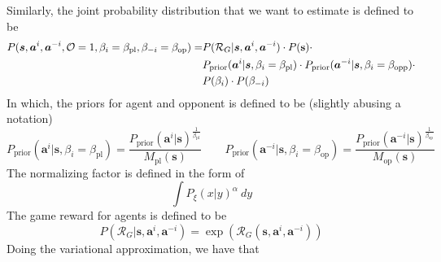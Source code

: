 Similarly, the joint probability distribution that we want to estimate is defined to be 
\begin{equation}
    \begin{aligned}
        P(\boldsymbol{s}, \boldsymbol{a}^i, \boldsymbol{a}^{-i}, \mathcal{O} = 1, \beta_i = \beta_{\text{pl}}, \beta_{-i} = \beta_{\text{op}}) = &P(\mathcal{R}_G | \boldsymbol{s}, \boldsymbol{a}^i, \boldsymbol{a}^{-i})\cdot P(\bold{s}) \cdot \\
        &P_{\text{prior}}(\boldsymbol{a}^i | \boldsymbol{s}, \beta_i = \beta_{\text{pl}}) \cdot P_{\text{prior}}(\boldsymbol{a}^{-i} | \boldsymbol{s}, \beta_i = \beta_{\text{opp}}) \cdot \\
        &P(\beta_i) \cdot P(\beta_{-i})
    \end{aligned}
\end{equation}
In which, the priors for agent and opponent is defined to be (slightly abusing a notation)
\begin{equation}
    P_{\text{prior}}(\boldsymbol{a}^i | \boldsymbol{s}, \beta_i = \beta_{\text{pl}}) = \frac{P_{\text{prior}}(\boldsymbol{a}^i | \boldsymbol{s})^{\frac{1}{\beta_{\text{pl}}}}}{M_{\text{pl}}(\boldsymbol{s})} \quad \quad P_{\text{prior}}(\boldsymbol{a}^{-i} | \boldsymbol{s}, \beta_i = \beta_{\text{op}}) = \frac{P_{\text{prior}}(\boldsymbol{a}^{-i} | \boldsymbol{s})^{\frac{1}{\beta_{\text{op}}}}}{M_{\text{op}}(\boldsymbol{s})}
\end{equation}
The normalizing factor is defined in the form of 
\begin{equation}
    \int P_{\xi}(x | y)^{\alpha} \ dy
\end{equation}
The game reward for agents is defined to be 
\begin{equation}
    P(\mathcal{R}_G | \boldsymbol{s}, \boldsymbol{a}^i, \boldsymbol{a}^{-i}) = \exp \left( \mathcal{R}_{G}(\boldsymbol{s}, \boldsymbol{a}^i, \boldsymbol{a}^{-i}) \right)
\end{equation}
Doing the variational approximation, we have that 
